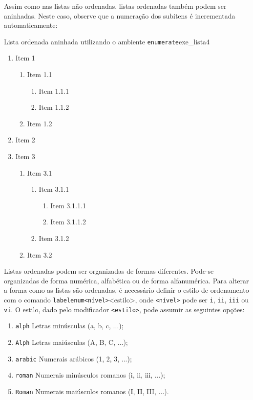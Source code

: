 Assim como nas listas não ordenadas, listas ordenadas também podem ser aninhadas. Neste caso, observe que a numeração dos subitens é incrementada automaticamente:

\begin{texexptitled}[breakable,enhanced,middle=2mm]{Lista ordenada aninhada utilizando o ambiente \texttt{enumerate}}{exe_lista4}
\begin{enumerate}
    \item Item 1
    \begin{enumerate}
        \item Item 1.1
        \begin{enumerate}
            \item Item 1.1.1
            \item Item 1.1.2
        \end{enumerate}
        \item Item 1.2
    \end{enumerate}
    \item Item 2
    \item Item 3
    \begin{enumerate}
        \item Item 3.1
         \begin{enumerate}
            \item Item 3.1.1
            \begin{enumerate}
                \item Item 3.1.1.1
                \item Item 3.1.1.2
            \end{enumerate}
            \item Item 3.1.2
        \end{enumerate}
        \item Item 3.2
    \end{enumerate}
\end{enumerate}
\end{texexptitled}

Listas ordenadas podem ser organizadas de formas diferentes. Pode-se organizadas de forma numérica, alfabética ou de forma alfanumérica. Para alterar a forma como as listas são ordenadas, é necessário definir o estilo de ordenamento com o comando \texttt{labelenum<nível>}{<estilo>}, onde {\tt <nível>} pode ser {\tt i}, {\tt ii}, {\tt iii} ou {\tt vi}. O estilo, dado pelo modificador {\tt <estilo>}, pode assumir as seguintes opções:

\begin{enumerate}
    \item {\tt alph} Letras minúsculas (a, b, c, ...);
    \item {\tt Alph} Letras maiúsculas (A, B, C, ...);
    \item {\tt arabic} Numerais arábicos (1, 2, 3, ...);
    \item {\tt roman} Numerais minúsculos romanos (i, ii, iii, ...);
    \item {\tt Roman} Numerais maiúsculos romanos (I, II, III, ...).
\end{enumerate}

